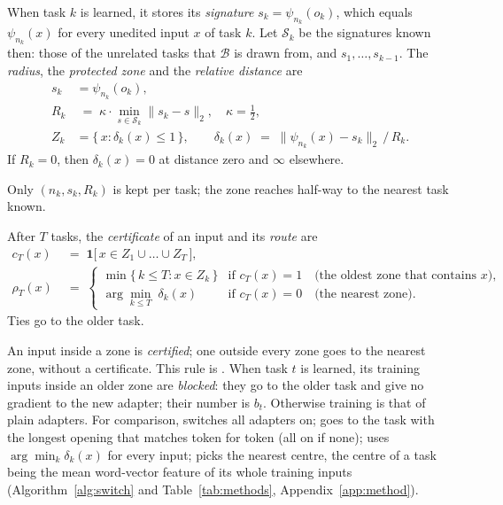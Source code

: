 \begin{definition}
When task $k$ is learned, it stores its \emph{signature} $s_k = \psi_{n_k}(o_k)$, which equals
$\psi_{n_k}(x)$ for every unedited input $x$ of task $k$. Let $\mathcal{S}_k$ be the signatures known
then: those of the unrelated tasks that $\mathcal{B}$ is drawn from, and $s_1, \dots, s_{k-1}$. The
\emph{radius}, the \emph{protected zone} and the \emph{relative distance} are
\begin{align}
  s_k &= \psi_{n_k}(o_k), \label{eq:signature}\\
  R_k &\;=\; \kappa \cdot \min_{s \in \mathcal{S}_k} \lVert s_k - s \rVert_2 , \quad \kappa = \tfrac{1}{2}, \label{eq:radius}\\
  Z_k &= \{\, x : \delta_k(x) \le 1 \,\} , \qquad
  \delta_k(x) \;=\; \lVert \psi_{n_k}(x) - s_k \rVert_2 \,/\, R_k . \label{eq:zone}
\end{align}
If $R_k = 0$, then $\delta_k(x) = 0$ at distance zero and $\infty$ elsewhere.
\end{definition}

Only $(n_k, s_k, R_k)$ is kept per task; the zone reaches half-way to the nearest task known.

\begin{definition}
After $T$ tasks, the \emph{certificate} of an input and its \emph{route} are
\begin{align}
  c_T(x) &\;=\; \mathbf{1}\bigl[\, x \in Z_1 \cup \dots \cup Z_T \,\bigr] , \label{eq:certificate}\\[2pt]
  \rho_T(x) &\;=\;
  \begin{cases}
    \min \{\, k \le T : x \in Z_k \,\} & \text{if } c_T(x) = 1 \quad \text{(the oldest zone that contains } x \text{)}, \\[2pt]
    \arg\min_{k \le T}\; \delta_k(x) & \text{if } c_T(x) = 0 \quad \text{(the nearest zone)} .
  \end{cases}
  \label{eq:route}
\end{align}
Ties go to the older task.
\end{definition}

An input inside a zone is \emph{certified}; one outside every zone goes to the nearest zone, without a
certificate. This rule is \cert{}. When task $t$ is learned, its training inputs inside an older zone
are \emph{blocked}: they go to the older task and give no gradient to the new adapter; their number
is $b_t$. Otherwise training is that of plain adapters. For comparison, \plain{}
switches all adapters on; \keyswitch{} goes to the task with the longest opening that matches token
for token (all on if none); \nearest{} uses $\arg\min_k \delta_k(x)$ for every input; \centre{} picks
the nearest centre, the centre of a task being the mean word-vector feature of its whole training
inputs
(Algorithm~\ref{alg:switch} and Table~\ref{tab:methods}, Appendix~\ref{app:method}).

